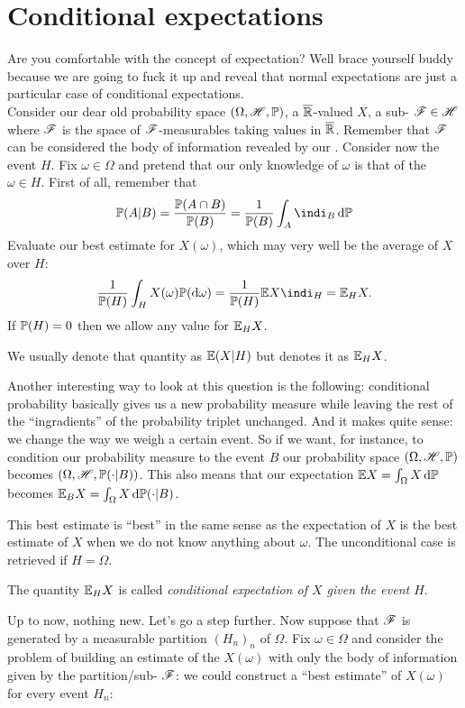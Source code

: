 \documentclass{report}
\begin{document}
\section{Conditional expectations}
Are you comfortable with the concept of expectation? Well brace yourself buddy because we are going to fuck it up and reveal that normal expectations are just a particular case of conditional expectations.\\
Consider our dear old probability space $(\Omega,\mathscr{H},\mathbb{P})$, a $\overline{\mathbb{R}}$-valued \rv{} $X$, a sub-\sa{} $\mathscr{F}\in\mathscr{H}$ where $\mathscr{F}$ is the space of $\mathscr{F}$-measurable\rv s taking values in $\overline{\mathbb{R}}$. Remember that $\mathscr{F}$ can be considered the body of information revealed by our \rv{}. Consider now the event $H$. Fix $\omega\in\Omega$ and pretend that our only knowledge of $\omega$ is that of the $\omega\in H$. First of all, remember that
\[\pr(A|B)=\frac{\pr(A\cap B)}{\pr(B)}=\frac{1}{\pr(B)}\int_A\indi_B\dpr\]
Evaluate our best estimate for $X(\omega)$, which may very well be the average of $X$ over $H$:
\begin{equation*}
	\frac{1}{\pr(H)}\int_H X(\omega)\pr(\dw)=\frac{1}{\pr(H)}\ev X\indi_H=\ev_H X.
\end{equation*}
If $\mathbb{P}(H)=0$ then we allow any value for $\mathbb{E}_H X$.
\begin{notation}
	We usually denote that quantity as $\mathbb{E}(X|H)$ but \cinlar denotes it as $\mathbb{E}_H X$.
\end{notation}
Another interesting way to look at this question is the following: conditional probability basically gives us a new probability measure while leaving the rest of the ``ingradients'' of the probability triplet unchanged. And it makes quite sense: we change the way we weigh a certain event. So if we want, for instance, to condition our probability measure to the event $B$ our probability space $(\Omega,\mathscr{H},\mathbb{P})$ becomes $(\Omega,\mathscr{H},\mathbb{P}(\cdot|B))$. This also means that our expectation $\mathbb{E} X=\int_\Omega X\mathop{}\!\mathrm{d}\mathbb{P}$ becomes $\mathbb{E}_B X=\int_\Omega X\mathop{}\!\mathrm{d}\mathbb{P}(\cdot|B)$.
\begin{remark}
	This best estimate is ``best'' in the same sense as the expectation of $X$ is the best estimate of $X$ when we do not know anything about $\omega$. The unconditional case is retrieved if $H=\Omega$.
\end{remark}
\begin{remark}
	The quantity $\mathbb{E}_H X$ is called \emph{conditional expectation of $X$ given the event $H$}.
\end{remark}
Up to now, nothing new. Let's go a step further. Now suppose that $\mathscr{F}$ is generated by a measurable partition ${(H_n)}_{n}$ of $\Omega$. Fix $\omega\in\Omega$ and consider the problem of building an estimate of the \rv{} $X(\omega)$ with only the body of information given by the partition/sub-\sa{} $\mathscr{F}$: we could construct a ``best estimate'' of $X(\omega)$ for every event $H_n$:
\end{document}
